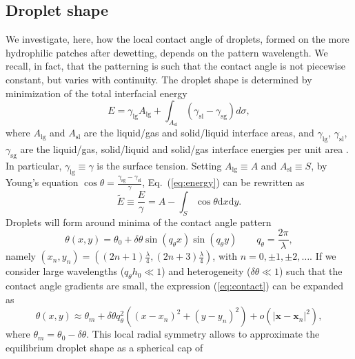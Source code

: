 \subsection{Droplet shape}

\noindent We investigate, here, how the local contact angle of droplets, formed on the more
hydrophilic patches after dewetting, depends on the pattern wavelength. We recall, in fact,
that the patterning is such that the contact angle is not piecewise constant, but varies
with continuity.
The droplet shape is determined by minimization of the total interfacial energy
\begin{equation}\label{eq:energy}
E = \gamma_{\text{lg}} A_{\text{lg}} + \int_{A_{\text{sl}}} (\gamma_{\text{sl}} - \gamma_{\text{sg}})d \sigma,
\end{equation}
where $A_{\text{lg}}$ and $A_{\text{sl}}$ are the liquid/gas and solid/liquid interface areas, and $\gamma_{\text{lg}}$, $\gamma_{\text{sl}}$,
$\gamma_{\text{sg}}$ are the liquid/gas, solid/liquid and solid/gas interface energies 
per unit area \cite{D0SM00196A}. 
In particular, $\gamma_{\text{lg}} \equiv \gamma$ is the surface tension.
Setting $A_{\text{lg}} \equiv A$ and $A_{\text{sl}} \equiv S$, by Young's equation 
$\cos \theta = \frac{\gamma_{\text{sg}} - \gamma_{\text{sl}}}{\gamma}$,
Eq.~(\ref{eq:energy}) can be rewritten as
\begin{equation}\label{eq:energyoung}
\tilde{E} \equiv \frac{E}{\gamma} = A - \int_S \cos \theta \text{d}x \text{d}y.
\end{equation}
Droplets will form around minima of the contact angle pattern
\begin{equation}\label{eq:contact}
\theta(x,y) = \theta_0 + \delta \theta \sin(q_{\theta} x) \sin (q_{\theta} y) \qquad q_{\theta} = \frac{2\pi}{\lambda},
\end{equation}
namely $(x_n,y_n) = \left((2n+1)\frac{\lambda}{4},(2n+3)\frac{\lambda}{4}\right)$, with
$n=0,\pm 1, \pm 2,\dots$.
If we consider large wavelengths ($q_{\theta} h_0 \ll 1$) and heterogeneity
($\delta \theta \ll 1$) such that the contact angle gradients are small, the
expression (\ref{eq:contact}) can be expanded as
\begin{equation}\label{eq:contact2}
\theta(x,y) \approx \theta_m + \delta \theta q_{\theta}^2 ((x-x_n)^2 + (y - y_n)^2) + o(|\mathbf{x}-\mathbf{x}_n|^2),
\end{equation}
where $\theta_m = \theta_0 - \delta \theta$.
This local radial symmetry allows to approximate the equilibrium droplet shape as a spherical cap of
